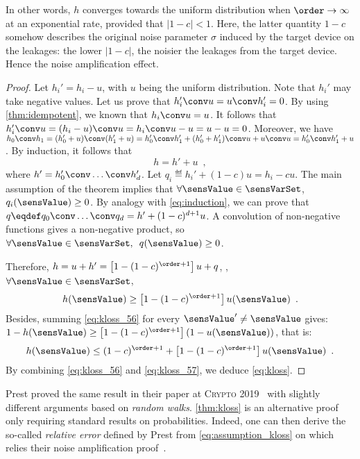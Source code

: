 In other words, \(h\) converges towards the uniform distribution when \(\order \to \infty\) at an exponential rate, provided that \(\lvert 1 - c \rvert < 1\).
Here, the latter quantity \(1-c\) somehow describes the original noise parameter \(\sigma\) induced by the target device on the leakages: the lower \(\lvert 1-c \rvert\), the noisier the leakages from the target device.
Hence the noise amplification effect.
\begin{proof}
    Let \(h_i' = h_i - u\),
    with \(u\) being the uniform distribution.
    Note that \(h_i'\) may take negative values.
    Let us prove that \(h_i' \conv u = u \conv h_i' = 0\).
    By using \autoref{thm:idempotent}, we known that \(h_i \conv u = u\).
    It follows that \(h_i' \conv u = (h_i - u) \conv u = h_i \conv u - u = u - u = 0\).
    Moreover, we have \(h_0 \conv h_1 = (h_0' + u) \conv (h_1' + u) = h_0' \conv h_1' + (h_0' + h_1') \conv u + u \conv u = h_0' \conv h_1' + u\).
    By induction, it follows that
    \begin{equation}
        h = h' + u \enspace ,
        \label{eq:induction}
    \end{equation} 
    where \(h' = h_0' \conv \ldots \conv h_d'\).
    Let \(q_i \eqdef h_i' + (1-c)u = h_i - cu\).
    The main assumption of the theorem implies that \(\forall \sensValue \in \sensVarSet\), \(q_i(\sensValue) \geq 0\).
    By analogy with \autoref{eq:induction}, we can prove that \(q \eqdef q_0 \conv \ldots \conv q_d = h' + (1-c)^{d+1}u\).
    A convolution of non-negative functions gives a non-negative product, so \(\forall \sensValue \in \sensVarSet, \enspace q(\sensValue) \geq 0\).

    Therefore, \(h = u + h' = \left[1 - (1-c)^{\order+1}\right]u + q\), \ie{}, \(\forall \sensValue \in \sensVarSet\),
    \begin{equation}
        h(\sensValue) \geq \left[1 - (1-c)^{\order+1}\right]u(\sensValue) \enspace .
        \label{eq:kloss_56}
    \end{equation}
    Besides, summing \autoref{eq:kloss_56} for every \(\sensValue' \neq \sensValue\) gives:
    \(1 - h(\sensValue) \geq \left[1 - (1-c)^{\order+1}\right] \left(1 - u(\sensValue)\right)\), that is:
    \begin{equation}
        h(\sensValue) \leq (1-c)^{\order+1} + \left[1 - (1-c)^{\order+1}\right]u(\sensValue) \enspace .
        \label{eq:kloss_57}
    \end{equation}
    By combining \autoref{eq:kloss_56} and \autoref{eq:kloss_57}, we deduce \autoref{eq:kloss}.
\end{proof}
Prest \etal{} proved the same result in their paper at \textsc{Crypto} 2019~\cite[Lemma~6]{prest_renyi_2019} with slightly different arguments based on \emph{random walks}.
\autoref{thm:kloss} is an alternative proof only requiring standard results on probabilities.
Indeed, one can then derive the so-called \emph{relative error} defined by Prest \etal{} from \autoref{eq:assumption_kloss} on which relies their noise amplification proof~\cite[Thm.~2]{prest_renyi_2019}.

